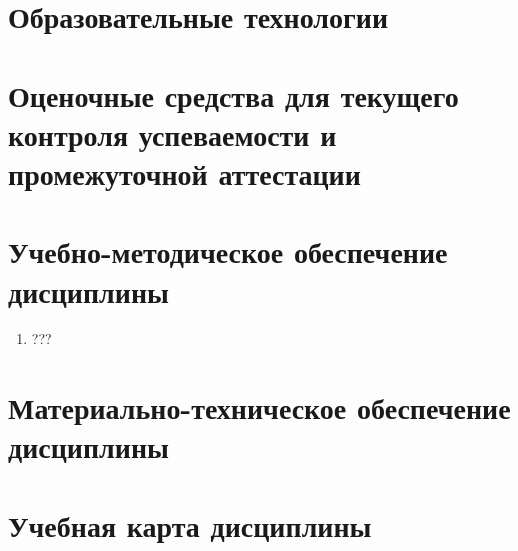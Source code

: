 



\section{Образовательные технологии}

\section{Оценочные средства для текущего контроля успеваемости и промежуточной аттестации}

\section{Учебно-методическое обеспечение дисциплины}


\begin{enumerate}%
	\item ???
\end{enumerate}




\section{Материально-техническое обеспечение дисциплины}
	



\section{Учебная карта дисциплины}



